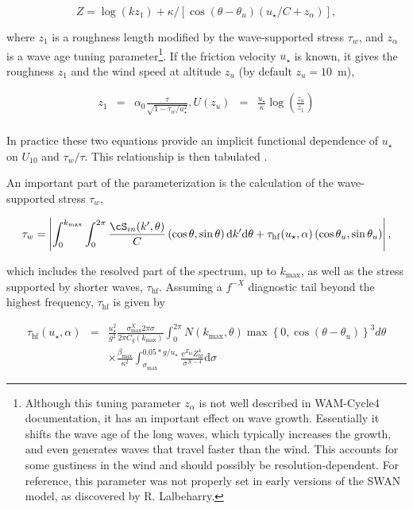 \begin{equation}
Z=\log(k z_1)+\kappa/\left[\cos\left(\theta - \theta_u\right)
\left(u_\star/C + z_\alpha \right)\right],
\end{equation}

\noindent
where $z_1$ is a roughness length modified by the wave-supported stress
$\tau_w$, and $z_\alpha$ is a wave age tuning parameter\footnote{Although this
tuning parameter $z_\alpha$ is not well described in WAM-Cycle4 documentation,
it has an important effect on wave growth. Essentially it shifts the wave age
of the long waves, which typically increases the growth, and even generates
waves that travel faster than the wind. This accounts for some gustiness in
the wind and should possibly be resolution-dependent. For reference, this
parameter was not properly set in early versions of the SWAN model, as
discovered by R. Lalbeharry.}.  If the friction velocity $u_\star$ is known, 
it gives the roughness $z_1$ and the wind speed at altitude $z_u$ (by default $z_u=10$~m),  

\begin{eqnarray}
z_1&=&\alpha_0 \frac{\tau}{ \sqrt{1-\tau_w/u_\star^2}},
U(z_u)&=&\frac{u_\star}{\kappa} \log\left(\frac{z_u}{z_1}\right) \\
\end{eqnarray}

\noindent
In practice these two equations provide an implicit functional dependence of
$u_\star$ on $U_{10}$ and $\tau_w/\tau$. This relationship is then tabulated
\citep{art:Jan91, rep:Bea07}.

An important part of the parameterization is the calculation of the
wave-supported stress $\tau_w$,

\begin{equation}
\tau_w=\left|\int_0^{k_{\max}} \int_0^{2 \pi} \frac{\cS_{in}(k',\theta)}{C}
\left(\cos \theta, \sin \theta \right)  {\mathrm d} k' \mathrm d \theta +
\tau_{\mathrm{hf}}(u_\star,\alpha) \left(\cos \theta_u, \sin \theta_u \right)
\right|,\label{eq:tauwint}
\end{equation}

\noindent
which includes the resolved part of the spectrum, up to $k_{\max}$, as well as
the stress supported by shorter waves, $\tau_{\mathrm{hf}}$. Assuming a
$f^{-X}$ diagnostic tail beyond the highest frequency, $\tau_{\mathrm{hf}}$ is
given by

\begin{eqnarray}
\tau_{\mathrm{hf}}(u_\star,\alpha)&= &\frac{u_{\star}^2}{g^2}
\frac{\sigma_{\max}^X 2 \pi \sigma }{2 \pi C_g(k_{\max})} \int_0^{2 \pi} N
\left(k_{\max},\theta \right)
\max\left\{0,\cos\left(\theta-\theta_u\right)\right\}^3 d \theta \nonumber \\
& & \times \frac{\beta_{\mathrm{max}}}{\kappa^2}
\int_{\sigma_{\max}}^{0.05*g/u_\star} \frac{{\mathrm
e}^{Z_{\mathrm{hf}}}Z_{\mathrm{hf}}^4}{\sigma^{X-4}} {\mathrm d} \sigma
\label{eq:tauhfint}
\end{eqnarray}

